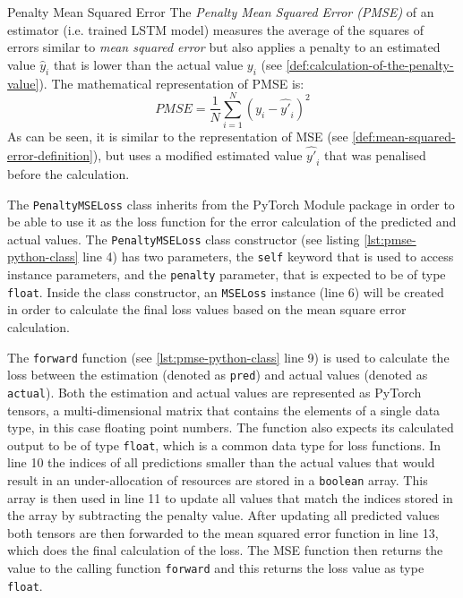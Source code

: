     \begin{pabox}{Penalty Mean Squared Error}
      \label{def:penalty-mean-squared-error-definition}
      The \emph{Penalty Mean Squared Error (PMSE)} of an estimator (i.e. trained LSTM model) measures the average of the squares of errors similar to \emph{mean squared error} but also applies a penalty to an estimated value $\hat{y}_i$ that is lower than the actual value $y_i$ (see \ref{def:calculation-of-the-penalty-value}). 
      The mathematical representation of PMSE is:
      $$PMSE = \frac{1}{N} \sum_{i = 1}^{N}\left(y_i - \hat{y'}_i\right)^2$$
      As can be seen, it is similar to the representation of MSE (see \ref{def:mean-squared-error-definition}), but uses a modified estimated value $\hat{y'}_i$ that was penalised before the calculation.
    \end{pabox}

    The \texttt{PenaltyMSELoss} class inherits from the PyTorch Module package in order to be able to use it as the loss function for the error calculation of the predicted and actual values.
    The \texttt{PenaltyMSELoss} class constructor (see listing \ref{lst:pmse-python-class} line 4) has two parameters, the \texttt{self} keyword that is used to access instance parameters, and the \texttt{penalty} parameter, that is expected to be of type \texttt{float}.
    Inside the class constructor, an \texttt{MSELoss} instance (line 6) will be created in order to calculate the final loss values based on the mean square error calculation.

    

    The \texttt{forward} function (see \ref{lst:pmse-python-class} line 9) is used to calculate the loss between the estimation (denoted as \texttt{pred}) and actual values (denoted as \texttt{actual}). Both the estimation and actual values are represented as PyTorch tensors, a multi-dimensional matrix that contains the elements of a single data type, in this case floating point numbers.
    The function also expects its calculated output to be of type \texttt{float}, which is a common data type for loss functions.
    In line 10 the indices of all predictions smaller than the actual values that would result in an under-allocation of resources are stored in a \texttt{boolean} array.
    This array is then used in line 11 to update all values that match the indices stored in the array by subtracting the penalty value.
    After updating all predicted values both tensors are then forwarded to the mean squared error function in line 13, which does the final calculation of the loss.
    The MSE function then returns the value to the calling function \texttt{forward} and this returns the loss value as type \texttt{float}.




